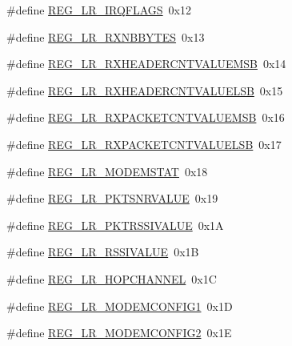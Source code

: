\begin{DoxyCompactItemize}
\item 
\#define \mbox{\hyperlink{sx1276_regs-_lo_ra_8h_a29222ef4f73d911623275ebbb7ddbaf0}{R\+E\+G\+\_\+\+L\+R\+\_\+\+I\+R\+Q\+F\+L\+A\+GS}}~0x12
\item 
\#define \mbox{\hyperlink{sx1276_regs-_lo_ra_8h_a5443dae2a149465cebef0aa8aad4d8aa}{R\+E\+G\+\_\+\+L\+R\+\_\+\+R\+X\+N\+B\+B\+Y\+T\+ES}}~0x13
\item 
\#define \mbox{\hyperlink{sx1276_regs-_lo_ra_8h_aaf42f47bffbc4e33e7a4a10a81aee5e7}{R\+E\+G\+\_\+\+L\+R\+\_\+\+R\+X\+H\+E\+A\+D\+E\+R\+C\+N\+T\+V\+A\+L\+U\+E\+M\+SB}}~0x14
\item 
\#define \mbox{\hyperlink{sx1276_regs-_lo_ra_8h_a8153ac7c0d03f1c769485b112383a733}{R\+E\+G\+\_\+\+L\+R\+\_\+\+R\+X\+H\+E\+A\+D\+E\+R\+C\+N\+T\+V\+A\+L\+U\+E\+L\+SB}}~0x15
\item 
\#define \mbox{\hyperlink{sx1276_regs-_lo_ra_8h_aab224430e41cf39e050a92927b8a2e03}{R\+E\+G\+\_\+\+L\+R\+\_\+\+R\+X\+P\+A\+C\+K\+E\+T\+C\+N\+T\+V\+A\+L\+U\+E\+M\+SB}}~0x16
\item 
\#define \mbox{\hyperlink{sx1276_regs-_lo_ra_8h_a999636679ece11f0f6cb0ad058db863a}{R\+E\+G\+\_\+\+L\+R\+\_\+\+R\+X\+P\+A\+C\+K\+E\+T\+C\+N\+T\+V\+A\+L\+U\+E\+L\+SB}}~0x17
\item 
\#define \mbox{\hyperlink{sx1276_regs-_lo_ra_8h_ac633e60a75224b850dc8429394e80e7c}{R\+E\+G\+\_\+\+L\+R\+\_\+\+M\+O\+D\+E\+M\+S\+T\+AT}}~0x18
\item 
\#define \mbox{\hyperlink{sx1276_regs-_lo_ra_8h_a2b0bc71a6460bd6e97cf8a6717c90cc5}{R\+E\+G\+\_\+\+L\+R\+\_\+\+P\+K\+T\+S\+N\+R\+V\+A\+L\+UE}}~0x19
\item 
\#define \mbox{\hyperlink{sx1276_regs-_lo_ra_8h_ac7db39cc10de754e5e5d7065ca2c1796}{R\+E\+G\+\_\+\+L\+R\+\_\+\+P\+K\+T\+R\+S\+S\+I\+V\+A\+L\+UE}}~0x1A
\item 
\#define \mbox{\hyperlink{sx1276_regs-_lo_ra_8h_a51636b899dd268fa04ddfa2c66329f05}{R\+E\+G\+\_\+\+L\+R\+\_\+\+R\+S\+S\+I\+V\+A\+L\+UE}}~0x1B
\item 
\#define \mbox{\hyperlink{sx1276_regs-_lo_ra_8h_a5eb22acab75323e171815532117539e4}{R\+E\+G\+\_\+\+L\+R\+\_\+\+H\+O\+P\+C\+H\+A\+N\+N\+EL}}~0x1C
\item 
\#define \mbox{\hyperlink{sx1276_regs-_lo_ra_8h_af759d830088be4284079ba8aa75d98ae}{R\+E\+G\+\_\+\+L\+R\+\_\+\+M\+O\+D\+E\+M\+C\+O\+N\+F\+I\+G1}}~0x1D
\item 
\#define \mbox{\hyperlink{sx1276_regs-_lo_ra_8h_ae96f87f817a89b1240cfdc89f17b6e30}{R\+E\+G\+\_\+\+L\+R\+\_\+\+M\+O\+D\+E\+M\+C\+O\+N\+F\+I\+G2}}~0x1E
\item 

\end{DoxyCompactItemize}
